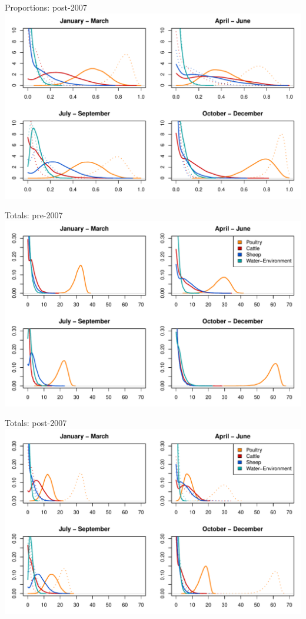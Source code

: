 \documentclass[]{beamer}
\begin{document}
\begin{frame}{Proportions: post-2007}
\includegraphics[width=\textwidth, trim=40 0 40 0]{Pictures/island/seasonal_props2.pdf}
\end{frame}

\begin{frame}{Totals: pre-2007}
\includegraphics[width=\textwidth, trim=40 0 40 0]{Pictures/island/seasonal_totals1.pdf}
\end{frame}

\begin{frame}{Totals: post-2007}
\includegraphics[width=\textwidth, trim=40 0 40 0]{Pictures/island/seasonal_totals2.pdf}
\end{frame}
\end{document}
